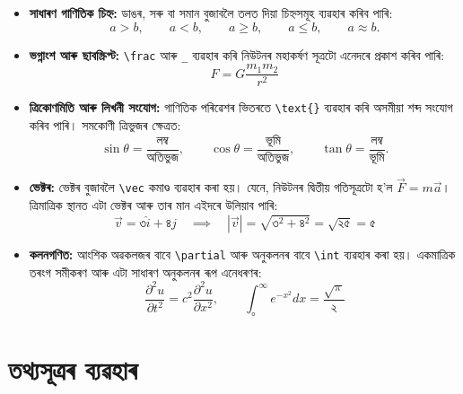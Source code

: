 \documentclass[12pt,a4paper]{article} %
\begin{document}
	\begin{itemize}
		\item \textbf{সাধাৰণ গাণিতিক চিহ্ন:} ডাঙৰ, সৰু বা সমান বুজাবলৈ তলত দিয়া চিহ্নসমূহ ব্যৱহাৰ কৰিব পাৰি:
		\begin{equation*}
			a > b,\qquad a < b,\qquad a \geq b,\qquad a \leq b,\qquad a \approx b.
		\end{equation*}
		
		\item \textbf{ভগ্নাংশ আৰু ছাবস্ক্ৰিপ্ট:} \texttt{\textbackslash frac} আৰু \texttt{\_} ব্যৱহাৰ কৰি নিউটনৰ মহাকৰ্ষণ সূত্ৰটো এনেদৰে প্ৰকাশ কৰিব পাৰি:
		\begin{equation*}
			F = G \frac{m_1 m_2}{r^2}
		\end{equation*}
		
		\item \textbf{ত্ৰিকোণমিতি আৰু লিখনী সংযোগ:} গাণিতিক পৰিৱেশৰ ভিতৰতে \texttt{\textbackslash text\{\}} ব্যৱহাৰ কৰি অসমীয়া শব্দ সংযোগ কৰিব পাৰি। সমকোণী ত্ৰিভুজৰ ক্ষেত্ৰত:
		\begin{equation*}
			\sin\theta = \frac{\text{লম্ব}}{\text{অতিভুজ}}, \qquad
			\cos\theta = \frac{\text{ভূমি}}{\text{অতিভুজ}}, \qquad
			\tan\theta = \frac{\text{লম্ব}}{\text{ভূমি}}.
		\end{equation*}
		
		\item \textbf{ভেক্টৰ:} ভেক্টৰ বুজাবলৈ \texttt{\textbackslash vec} কমাণ্ড ব্যৱহাৰ কৰা হয়। যেনে, নিউটনৰ দ্বিতীয় গতিসূত্ৰটো হ'ল $\vec{F} = m\vec{a}$। ত্ৰিমাত্ৰিক স্থানত এটা ভেক্টৰ আৰু তাৰ মান এইদৰে উলিয়াব পাৰি:
		\begin{equation*}
			\vec{v} = ৩\hat{i} + ৪\hat{j} \quad \implies \quad |\vec{v}| = \sqrt{৩^2 + ৪^2} = \sqrt{২৫} = ৫
		\end{equation*}
		
		\item \textbf{কলনগণিত:} আংশিক অৱকলজৰ বাবে \texttt{\textbackslash partial} আৰু অনুকলনৰ বাবে \texttt{\textbackslash int} ব্যৱহাৰ কৰা হয়। একমাত্ৰিক তৰংগ সমীকৰণ আৰু এটা সাধাৰণ অনুকলনৰ ৰূপ এনেধৰণৰ:
		\begin{equation*}
			\frac{\partial^2 u}{\partial t^2} = c^2 \frac{\partial^2 u}{\partial x^2}, \qquad \int_{০}^{\infty} e^{-x^2} dx = \frac{\sqrt{\pi}}{২}
		\end{equation*}
	\end{itemize}
	
	\section{তথ্যসূত্ৰৰ ব্যৱহাৰ}
	
\end{document}

